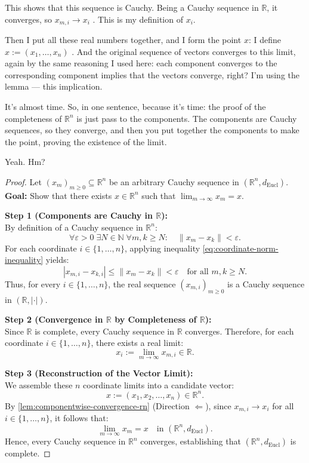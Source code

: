 \begin{proofWrapper}
\begin{speech}[01:17:55 - 01:19:37]
This shows that this sequence is Cauchy. Being a Cauchy sequence in $\mathbb{R}$, it converges, so $x_{m,i} \to x_i$ . This is my definition of $x_i$.

Then I put all these real numbers together, and I form the point $x$: I define $x := (x_1, \dots, x_n)$ . And the original sequence of vectors converges to this limit, again by the same reasoning I used here: each component converges to the corresponding component implies that the vectors converge, right? I'm using the lemma --- this implication.

It's almost time. So, in one sentence, because it's time: the proof of the completeness of $\mathbb{R}^n$ is just pass to the components. The components are Cauchy sequences, so they converge, and then you put together the components to make the point, proving the existence of the limit.

Yeah. Hm?
\end{speech}

\begin{content}
\begin{proof}
Let $(x_m)_{m \ge 0} \subseteq \mathbb{R}^n$ be an arbitrary Cauchy sequence in $(\mathbb{R}^n, d_{\text{Eucl}})$.
\textbf{Goal:} Show that there exists $x \in \mathbb{R}^n$ such that $\lim_{m \to \infty} x_m = x. $

\textbf{Step 1 (Components are Cauchy in $\mathbb{R}$):} \\
By definition of a Cauchy sequence in $\mathbb{R}^n$:
\[
\forall \varepsilon > 0 \;\exists N \in \mathbb{N} \;\forall m, k \ge N \colon \quad \|x_m - x_k\| < \varepsilon.
\]
For each coordinate $i \in \{1, \dots, n\}$, applying inequality \eqref{eq:coordinate-norm-inequality} yields:
\[
|x_{m,i} - x_{k,i}| \le \|x_m - x_k\| < \varepsilon \quad \text{for all } m, k \ge N.
\]
Thus, for every $i \in \{1, \dots, n\}$, the real sequence $(x_{m,i})_{m \ge 0}$ is a Cauchy sequence in $(\mathbb{R}, |\cdot|)$.

\textbf{Step 2 (Convergence in $\mathbb{R}$ by Completeness of $\mathbb{R}$):} \\
Since $\mathbb{R}$ is complete, every Cauchy sequence in $\mathbb{R}$ converges. Therefore, for each coordinate $i \in \{1, \dots, n\}$, there exists a real limit:
\[
x_i := \lim_{m \to \infty} x_{m,i} \in \mathbb{R}.
\]

\textbf{Step 3 (Reconstruction of the Vector Limit):} \\
We assemble these $n$ coordinate limits into a candidate vector:
\[
x := (x_1, x_2, \dots, x_n) \in \mathbb{R}^n.
\]
By \cref{lem:componentwise-convergence-rn} (Direction $\Longleftarrow$), since $x_{m,i} \to x_i$ for all $i \in \{1, \dots, n\}$, it follows that:
\[
\lim_{m \to \infty} x_m = x \quad \text{in } (\mathbb{R}^n, d_{\text{Eucl}}).
\]
Hence, every Cauchy sequence in $\mathbb{R}^n$ converges, establishing that $(\mathbb{R}^n, d_{\text{Eucl}})$ is complete.
\end{proof}
\end{content}


\end{proofWrapper}

